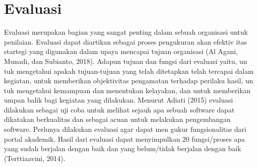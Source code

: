 \section{Evaluasi}
Evaluasi merupakan bagian yang sangat penting dalam sebuah organisasi untuk penilaian. Evaluasi dapat diartikan sebagai proses pengukuran akan efektiv itas startegi yang digunakan dalam upaya mencapai tujuan organisasi (Al Agani, Munadi, dan Subianto, 2018). Adapun tujuan dan fungsi dari evaluasi yaitu, un tuk mengetahui apakah tujuan-tujuan yang telah ditetapkan telah tercapai dalam kegiatan, untuk memberikan objektivitas pengamatan terhadap perilaku hasil, un tuk mengetahui kemampuan dan menentukan kelayakan, dan untuk memberikan umpan balik bagi kegiatan yang dilakukan. Menurut Adiati (2015) evaluasi dilakukan sebagai uji coba untuk melihat sejauh apa sebuah software dapat dikatakan berkualitas dan sebagai acuan untuk melakukan pengembangan software. Perlunya dilakukan evaluasi agar dapat men gukur fungsionalitas dari portal akademik. Hasil dari evaluasi dapat menyimpulkan 20 fungsi/proses apa yang sudah berjalan dengan baik dan yang belum/tidak berjalan dengan baik (Terttiaavini, 2014).

